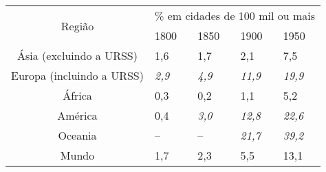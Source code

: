 \begin{table}[!htp]
\centering
{}
{
\begin{tabular}{c m{2cm} m{2cm} m{2cm} m{2cm}}
\hline 
\multirow{2}{*}{Região} & \multicolumn{4}{c}{\% em cidades de 100 mil ou mais}\\ 
\cline{2-5} & 1800 & 1850 & 1900 & 1950 \\ 
\hline
Ásia (excluindo a URSS) & 1,6 & 1,7 & 2,1 & 7,5 \\ 
Europa (incluindo a URSS) & \textit{2,9} & \textit{4,9} & \textit{11,9} & \textit{19,9} \\ 
África & 0,3 & 0,2 & 1,1 & 5,2 \\ 
América & 0,4 & \textit{3,0} & \textit{12,8} & \textit{22,6} \\ 
Oceania & -- & -- & \textit{21,7} & \textit{39,2} \\ 
Mundo & 1,7 & 2,3 & 5,5 & 13,1 \\ 
\hline 
\end{tabular} 
}
{}
\end{table}